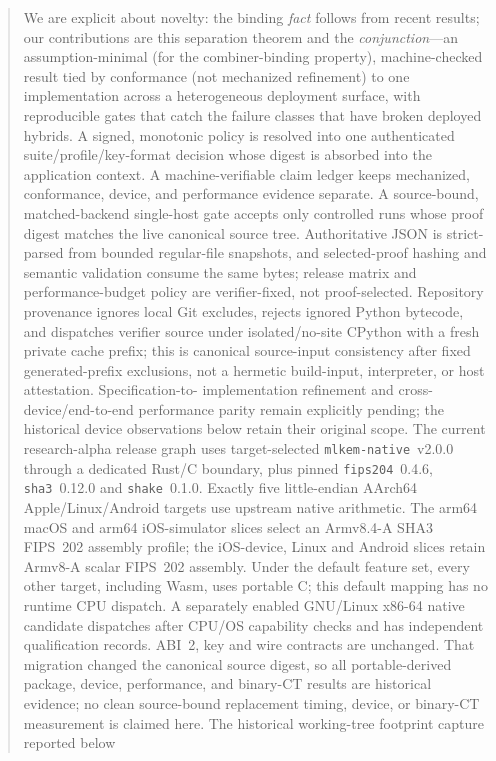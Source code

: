 \documentclass[journal]{IEEEtran}
\newcommand{\code}[1]{\texttt{\small #1}}
\begin{document}
\begin{abstract}
We are explicit about novelty: the binding \emph{fact} follows from recent results; our
contributions are this separation theorem and the \emph{conjunction}---an assumption-minimal
(for the combiner-binding property), machine-checked result tied by conformance (not mechanized
refinement) to one implementation across a heterogeneous deployment surface, with reproducible gates
that catch the failure classes that have broken deployed hybrids. A signed, monotonic policy is
resolved into one authenticated suite/profile/key-format decision whose digest is absorbed into the
application context. A machine-verifiable claim ledger keeps mechanized, conformance, device, and
performance evidence separate. A source-bound, matched-backend single-host gate accepts only
controlled runs whose proof digest matches the live canonical source tree. Authoritative JSON is
strict-parsed from bounded regular-file snapshots, and selected-proof hashing and semantic
validation consume the same bytes; release matrix and performance-budget policy are verifier-fixed,
not proof-selected. Repository provenance ignores local Git excludes, rejects ignored Python
bytecode, and dispatches verifier source under isolated/no-site CPython with a fresh private cache
prefix; this is canonical source-input consistency after fixed generated-prefix exclusions, not a
hermetic build-input, interpreter, or host attestation. Specification-to-
implementation refinement and cross-device/end-to-end performance parity remain
explicitly pending; the historical device observations below retain their original scope. The current research-alpha release graph uses
target-selected \code{mlkem-native}~v2.0.0 through a dedicated Rust/C boundary,
plus pinned \code{fips204}~0.4.6, \code{sha3}~0.12.0 and \code{shake}~0.1.0. Exactly five
little-endian AArch64 Apple/Linux/Android targets use upstream native arithmetic.
The arm64 macOS and arm64 iOS-simulator slices select an Armv8.4-A SHA3 FIPS~202
assembly profile; the iOS-device, Linux and Android slices retain Armv8-A scalar
FIPS~202 assembly. Under the default feature set, every other target, including
Wasm, uses portable C; this default mapping has no runtime CPU dispatch.
A separately enabled GNU/Linux x86-64 native candidate dispatches after CPU/OS
capability checks and has independent qualification records. ABI~2, key and wire
contracts are unchanged. That migration changed the canonical source
digest, so all portable-derived package, device, performance, and binary-CT results
are historical evidence; no clean source-bound replacement timing, device, or
binary-CT measurement is claimed here. The historical working-tree footprint capture reported below

\end{abstract}
\end{document}
